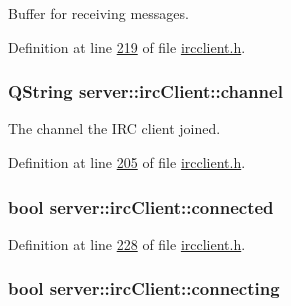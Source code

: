 Buffer for receiving messages. 



Definition at line \hyperlink{ircclient_8h_source_l00219}{219} of file \hyperlink{ircclient_8h_source}{ircclient.\-h}.

\hypertarget{classserver_1_1irc_client_a01d41f735fe9f0227b72e794c060a798}{
\subsubsection[{channel}]{\setlength{\rightskip}{0pt plus 5cm}Q\-String server\-::irc\-Client\-::channel\hspace{0.3cm}{\ttfamily [private]}}}\label{d1/d10/classserver_1_1irc_client_a01d41f735fe9f0227b72e794c060a798}


The channel the I\-R\-C client joined. 



Definition at line \hyperlink{ircclient_8h_source_l00205}{205} of file \hyperlink{ircclient_8h_source}{ircclient.\-h}.

\hypertarget{classserver_1_1irc_client_a04f2961ee284d05ad2ae358661304c17}{
\subsubsection[{connected}]{\setlength{\rightskip}{0pt plus 5cm}bool server\-::irc\-Client\-::connected\hspace{0.3cm}{\ttfamily [private]}}}\label{d1/d10/classserver_1_1irc_client_a04f2961ee284d05ad2ae358661304c17}


Definition at line \hyperlink{ircclient_8h_source_l00228}{228} of file \hyperlink{ircclient_8h_source}{ircclient.\-h}.

\hypertarget{classserver_1_1irc_client_a3492cfcbd64e62fd28db7ac326d87c78}{
\subsubsection[{connecting}]{\setlength{\rightskip}{0pt plus 5cm}bool server\-::irc\-Client\-::connecting\hspace{0.3cm}{\ttfamily [private]}}}\label{d1/d10/classserver_1_1irc_client_a3492cfcbd64e62fd28db7ac326d87c78}


